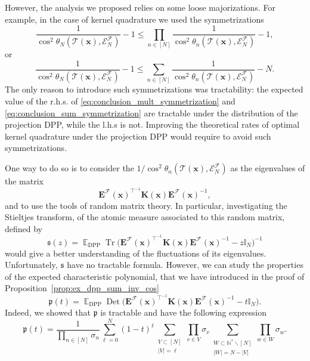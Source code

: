 \documentclass[twoside,11pt]{book}
\numberwithin{theorem}{chapter}
\numberwithin{definition}{chapter}
\numberwithin{proposition}{chapter}
\numberwithin{corollary}{chapter}
\numberwithin{example}{chapter}
\numberwithin{lemma}{chapter}
\numberwithin{assumption}{chapter}
\numberwithin{equation}{chapter}
\numberwithin{figure}{chapter}
\DeclareMathOperator{\Tr}{Tr}
\DeclareMathOperator{\Det}{Det}
\DeclareMathOperator{\DPP}{\mathrm{DPP}}
\DeclareMathOperator{\Tran}{\intercal}
\DeclareMathOperator{\EX}{\mathbb{E}}
\begin{document}
However, the analysis we proposed relies on some loose majorizations.
For example, in the case of kernel quadrature we used the symmetrizations
\begin{equation}\label{eq:conclusion_mult_symmetrization}
\frac{1}{\cos^{2} \theta_{N}(\mathcal{T}(\bm{x}),\mathcal{E}^{\mathcal{F}}_{N})} - 1 \leq \prod\limits_{n \in [N]}\frac{1}{\cos^{2} \theta_{n}(\mathcal{T}(\bm{x}),\mathcal{E}^{\mathcal{F}}_{N})} -1, 
\end{equation}
or
\begin{equation}\label{eq:conclusion_sum_symmetrization}
\frac{1}{\cos^{2} \theta_{N}(\mathcal{T}(\bm{x}),\mathcal{E}^{\mathcal{F}}_{N})} - 1 \leq \sum\limits_{n \in [N]}\frac{1}{\cos^{2} \theta_{n}(\mathcal{T}(\bm{x}),\mathcal{E}^{\mathcal{F}}_{N})} -N. 
\end{equation}
The only reason to introduce such symmetrizations was tractability: 
the expected value of the r.h.s. of \eqref{eq:conclusion_mult_symmetrization} and \eqref{eq:conclusion_sum_symmetrization} are tractable under the distribution of the projection DPP, while the l.h.s is not. Improving the theoretical rates of optimal kernel quadrature under the projection DPP would require to avoid such symmetrizations.

One way to do so is to consider the $1\big/\cos^{2} \theta_{n}(\mathcal{T}(\bm{x}),\mathcal{E}^{\mathcal{F}}_{N})$ as the eigenvalues of the matrix 
\begin{equation}
\bm{E}^{\mathcal{F}}(\bm{x})^{\Tran^{-1}}\bm{K}(\bm{x})\bm{E}^{\mathcal{F}}(\bm{x})^{-1},
\end{equation}
and to use the tools of random matrix theory. In particular, investigating the Stieltjes transform, of the atomic measure associated to this random matrix, defined by 
\begin{equation}\label{eq:stieljes}
\mathfrak{s}(z) = \EX_{\DPP} \Tr \big(\bm{E}^{\mathcal{F}}(\bm{x})^{\Tran^{-1}}\bm{K}(\bm{x})\bm{E}^{\mathcal{F}}(\bm{x})^{-1} -z \mathbb{I}_{N} \big)^{-1}
\end{equation}
would give a better understanding of the fluctuations of its eigenvalues. Unfortunately, $\mathfrak{s}$ have no tractable formula. However, we can study the properties of the expected
characteristic polynomial, that we have introduced in the proof of Proposition~\ref{prop:ex_dpp_sum_inv_cos}
\begin{equation}
\mathfrak{p}(t) = \EX_{\DPP} \Det \big(  \bm{E}^{\mathcal{F}}(\bm{x})^{\Tran^{-1}}\bm{K}(\bm{x})\bm{E}^{\mathcal{F}}(\bm{x})^{-1} -t \mathbb{I}_{N} \big).
\end{equation}
Indeed, we showed that $\mathfrak{p}$ is tractable and have the following expression
\begin{equation}\label{eq:conclusion_expected_char_polynomial}
\mathfrak{p}(t) =  \frac{1}{\prod\limits_{n \in [N]}\sigma_n} \sum\limits_{\ell =0}^{N} (1-t)^{\ell} \sum\limits_{\substack{V \subset [N]\\|V| = \ell}} \prod\limits_{v \in V}\sigma_{v}  \sum\limits_{\substack{W \subset \mathbb{N}^{*} \smallsetminus[N]\\  |W|= N-|V|}}  \prod\limits_{w \in W}\sigma_{w}.
\end{equation}
\end{document}
